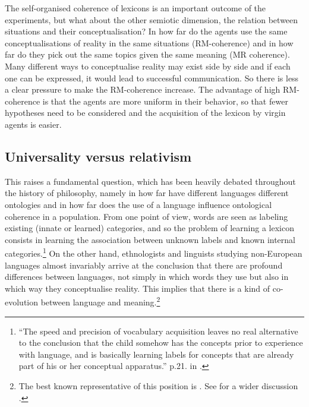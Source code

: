 The self-organised coherence of lexicons is an important
outcome of the experiments, but what about the other
semiotic dimension, the relation
between situations and their conceptualisation? 
In how far do the agents use the same 
conceptualisations of reality in the same situations
(RM-coherence) and in how far do they pick out the same topics
given the same meaning (MR coherence). Many different ways
to conceptualise reality may exist side by side and if
each one can be expressed, it would lead to successful
communication. So there is 
less a clear pressure to make the RM-coherence increase. 
The advantage of high RM-coherence is that the agents 
are more uniform in their behavior, so that fewer 
hypotheses need to be considered and the acquisition of 
the lexicon by virgin agents is easier. 

\subsection{Universality versus relativism}

This raises a fundamental question, which has been
heavily debated throughout the history of 
philosophy, namely in how far have different languages
different ontologies and in how far does the use of a 
language influence ontological coherence in 
a population. From one point of view, words are seen as labeling 
existing (innate or learned) categories, and so the problem
of learning a lexicon consists in learning 
the association between unknown labels and \enlargethispage{1\baselineskip}
known internal categories.\footnote{
``The speed and precision of vocabulary acquisition 
leaves no real alternative to the conclusion that the 
child somehow has the concepts prior to 
experience with language, and is basically learning 
labels for concepts that are already part of his or 
her conceptual apparatus.'' p.21. in \cite{Chomsky:1987}.}
On the other hand, ethnologists and linguists studying 
non-European languages almost invariably arrive at the 
conclusion that there are profound differences between 
languages, not simply in which words they use but also 
in which way they conceptualise reality. This implies
that there is a kind of co-evolution between language
and meaning.\footnote{The best known representative of 
this position is \cite{Whorf:1956}. 
See for a wider discussion \cite{Lee:1996}.}

